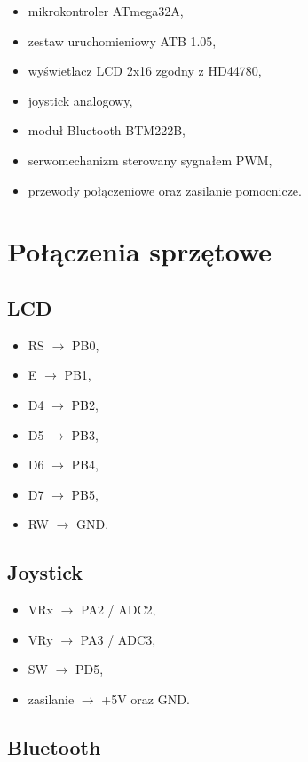 \documentclass[a4paper,12pt]{article}
\begin{document}
\begin{itemize}[leftmargin=1.2cm]
    \item mikrokontroler ATmega32A,
    \item zestaw uruchomieniowy ATB 1.05,
    \item wyświetlacz LCD 2x16 zgodny z HD44780,
    \item joystick analogowy,
    \item moduł Bluetooth BTM222B,
    \item serwomechanizm sterowany sygnałem PWM,
    \item przewody połączeniowe oraz zasilanie pomocnicze.
\end{itemize}

\section{Połączenia sprzętowe}

\subsection{LCD}

\begin{itemize}[leftmargin=1.2cm]
    \item RS $\rightarrow$ PB0,
    \item E $\rightarrow$ PB1,
    \item D4 $\rightarrow$ PB2,
    \item D5 $\rightarrow$ PB3,
    \item D6 $\rightarrow$ PB4,
    \item D7 $\rightarrow$ PB5,
    \item RW $\rightarrow$ GND.
\end{itemize}

\subsection{Joystick}

\begin{itemize}[leftmargin=1.2cm]
    \item VRx $\rightarrow$ PA2 / ADC2,
    \item VRy $\rightarrow$ PA3 / ADC3,
    \item SW $\rightarrow$ PD5,
    \item zasilanie $\rightarrow$ +5V oraz GND.
\end{itemize}

\subsection{Bluetooth}
\end{document}
